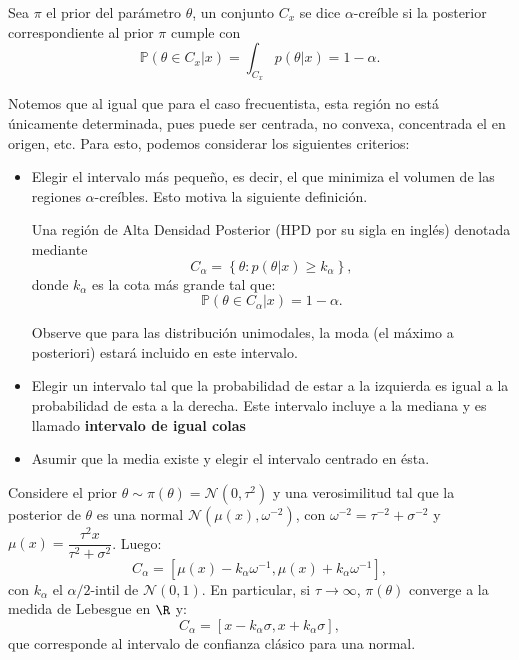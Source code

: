 \begin{definition}
Sea $\pi$ el prior del parámetro $\theta$, un conjunto $C_x$ se dice  $\alpha$-creíble si la posterior correspondiente al prior $\pi$ cumple con 
$$
\mathbb{P}(\theta \in C_x |x) = \int_{C_x}p(\theta |x) = 1- \alpha.
$$
\end{definition}

Notemos que al igual que para el caso frecuentista, esta región no está únicamente determinada, pues puede ser centrada, no convexa, concentrada el en origen, etc. Para esto, podemos considerar los siguientes criterios: 

\begin{itemize}
    \item Elegir el intervalo más pequeño, es decir,  el que minimiza el volumen de las regiones $\alpha$-creíbles. Esto motiva la siguiente definición.
    \begin{definition}
    Una región de Alta Densidad Posterior (HPD por su sigla en inglés) denotada mediante 
    $$
    C_{\alpha}  = \left \{ \theta: p(\theta|x) \geq  k_{\alpha}\right \} ,
    $$
    donde $k_{\alpha}$ es la cota más grande tal que: 
    $$
    \mathbb{P}(\theta \in C_{\alpha}|x) = 1- \alpha.
    $$
    \end{definition}

     Observe que para las distribución unimodales, la moda (el máximo a posteriori) estará incluido en este intervalo. 
     
     \item Elegir un intervalo tal que la probabilidad de estar a la izquierda es igual a la probabilidad de esta a la derecha. Este intervalo incluye a la mediana y es llamado \textbf{intervalo de igual colas}
     \item Asumir que la media existe y elegir el intervalo centrado en ésta.
\end{itemize}



\begin{example}
Considere el prior $\theta \sim \pi(\theta) =  \mathcal{N}(0,\tau^{2})$ y una verosimilitud tal que la posterior de $\theta$ es una normal $\mathcal{N}(\mu(x),\omega^{-2})$, con $\omega^{-2}= \tau^{-2} + \sigma^{-2} $
y $\mu(x)=\dfrac{\tau^{2}x}{\tau^2 + \sigma^2}$. Luego: 
$$
C_{\alpha} =[\mu(x) - k_{\alpha}\omega^{-1},\mu(x)+k_{\alpha}\omega^{-1} ],
$$
con $k_{\alpha}$ el $\alpha /2 $-intil de $\mathcal{N}(0,1)$. En particular, si $\tau \to \infty$, $\pi(\theta)$ converge a la medida de Lebesgue en $\R $ y: 
$$
C_{\alpha}= [x - k_{\alpha}\sigma ,x + k_{\alpha}\sigma],
$$
que corresponde al intervalo de confianza clásico para una normal. 
\end{example}


